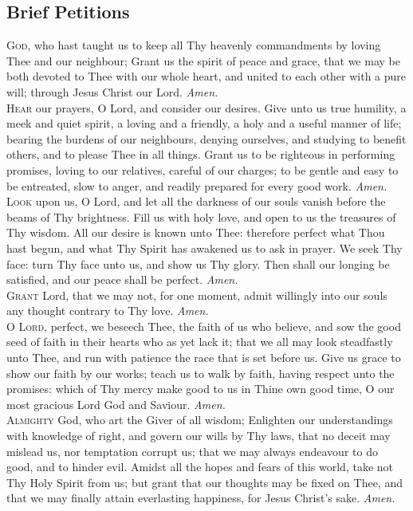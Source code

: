 \subsection*{Brief Petitions} 

\lettrine{G}{od,} who hast taught us to keep all Thy heavenly
commandments by loving Thee and our neighbour;
Grant us the spirit of peace and grace, that we may be
both devoted to Thee with our whole heart, and united to
each other with a pure will; through Jesus Christ our
Lord.
\textit{Amen.} \\

\lettrine{H}{ear} our prayers, O Lord, and consider our desires.
Give unto us true humility, a meek and quiet spirit,
a loving and a friendly, a holy and a useful manner of life;
bearing the burdens of our neighbours, denying ourselves,
and studying to benefit others, and to please Thee in all
things. Grant us to be righteous in performing promises,
loving to our relatives, careful of our charges; to be gentle
and easy to be entreated, slow to anger, and readily prepared for every good work.
\textit{Amen.} \\

\lettrine{L}{ook} upon us, O Lord, and let all the darkness of our
souls vanish before the beams of Thy brightness. Fill
us with holy love, and open to us the treasures of Thy
wisdom. All our desire is known unto Thee: therefore
perfect what Thou hast begun, and what Thy Spirit has
awakened us to ask in prayer. We seek Thy face: turn
Thy face unto us, and show us Thy glory. Then shall our
longing be satisfied, and our peace shall be perfect.
\textit{Amen.} \\

\lettrine{G}{rant} Lord, that we may not, for one moment, admit
willingly into our souls any thought contrary to Thy love.
\textit{Amen.} \\

\lettrine{O}{ Lord,} perfect, we beseech Thee, the faith of us who
believe, and sow the good seed of faith in their hearts
who as yet lack it; that we all may look steadfastly unto
Thee, and run with patience the race that is set before us.
Give us grace to show our faith by our works; teach us to
walk by faith, having respect unto the promises: which of
Thy mercy make good to us in Thine own good time, O
our most gracious Lord God and Saviour.
\textit{Amen.} \\

\lettrine{A}{lmighty} God, who art the Giver of all wisdom; Enlighten our understandings with knowledge of right,
and govern our wills by Thy laws, that no deceit may mislead us, nor temptation corrupt us; that we may always
endeavour to do good, and to hinder evil. Amidst all the
hopes and fears of this world, take not Thy Holy Spirit
from us; but grant that our thoughts may be fixed on Thee,
and that we may finally attain everlasting happiness, for
Jesus Christ’s sake.
\textit{Amen.} \\

